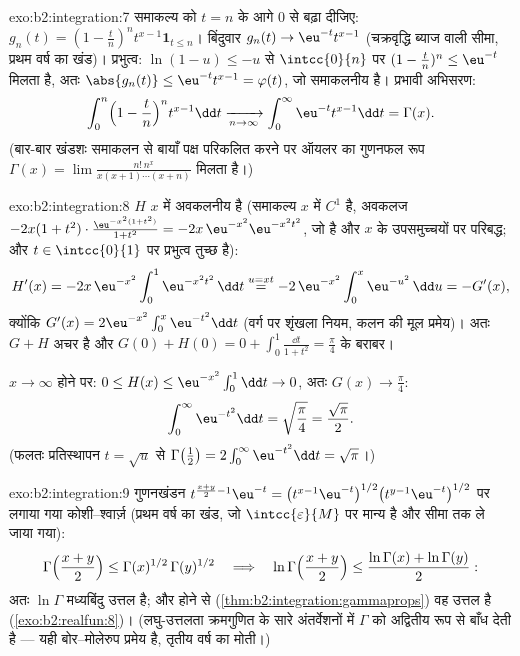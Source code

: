 \begin{solution}{exo:b2:integration:7}
समाकल्य को $t = n$ के आगे $0$ से बढ़ा दीजिए: $g_n(t) = (1 -
\frac tn)^n t^{x-1}\mathbf{1}_{t \leq n}$। बिंदुवार $g_n(t) \to
\eu^{-t}t^{x-1}$ (चक्रवृद्धि
ब्याज वाली सीमा, प्रथम वर्ष का खंड)। प्रभुत्व: $\ln(1 - u) \leq -u$ से $\intcc{0}{n}$ पर $(1 - \frac tn)^n \leq
\eu^{-t}$ मिलता
है, अतः $\abs{g_n(t)} \leq
\eu^{-t}t^{x-1} = \varphi(t)$, जो समाकलनीय है। प्रभावी अभिसरण:
\[
\int_0^n \Bigl(1 - \frac tn\Bigr)^n t^{x-1}\dd t
\xrightarrow[n\to\infty]{} \int_0^\infty \eu^{-t}t^{x-1}\dd t
= \Gamma(x) .
\]
(बार-बार खंडशः समाकलन से बायाँ पक्ष परिकलित करने पर ऑयलर का गुणनफल रूप
$\Gamma(x) = \lim \frac{n!\,n^x}{x(x+1)\cdots(x+n)}$ मिलता है।)
\end{solution}

\begin{solution}{exo:b2:integration:8}
$H$ $x$ में अवकलनीय है (समाकल्य $x$ में $C^1$ है, अवकलज $-2x(1+t^2)\cdot\frac{\eu^{-x^2(1+t^2)}}{1+t^2} =
-2x\,\eu^{-x^2}\eu^{-x^2t^2}$, जो  है
और $x$ के  उपसमुच्चयों पर परिबद्ध; और $t \in \intcc{0}{1}$ पर प्रभुत्व तुच्छ है):
\[
H'(x) = -2x\,\eu^{-x^2}\int_0^1 \eu^{-x^2t^2}\,\dd t
\overset{u = xt}{=} -2\,\eu^{-x^2}\int_0^x \eu^{-u^2}\,\dd u
= -G'(x),
\]
क्योंकि $G'(x) = 2\eu^{-x^2}\int_0^x \eu^{-t^2}\dd t$ (वर्ग पर शृंखला नियम, कलन की मूल प्रमेय)। अतः $G + H$ अचर है और
$G(0) + H(0) = 0 + \int_0^1 \frac{\dd t}{1+t^2}
= \frac\pi4$ के बराबर।

$x \to \infty$ होने पर: $0 \leq H(x) \leq \eu^{-x^2}\int_0^1 \dd t \to
0$, अतः $G(x) \to \frac\pi4$:
\[
\int_0^\infty \eu^{-t^2}\dd t = \sqrt{\frac\pi4} =
\frac{\sqrt\pi}{2} .
\]
(फलतः प्रतिस्थापन $t = \sqrt u$ से $\Gamma\bigl(\frac12\bigr) = 2\int_0^\infty
\eu^{-t^2}\dd t = \sqrt\pi$।)
\end{solution}

\begin{solution}{exo:b2:integration:9}
गुणनखंडन $t^{\frac{x+y}{2}-1}\eu^{-t} = \bigl(t^{x-1}\eu^{-t}\bigr)^{1/2}
\bigl(t^{y-1}\eu^{-t}\bigr)^{1/2}$ पर लगाया गया कोशी--श्वार्ज़ (प्रथम वर्ष का खंड, जो $\intcc{\varepsilon}{M}$ पर
मान्य है और सीमा तक ले जाया गया):
\[
\Gamma\Bigl(\frac{x+y}{2}\Bigr) \leq
\Gamma(x)^{1/2}\,\Gamma(y)^{1/2}
\quad\Longrightarrow\quad
\ln\Gamma\Bigl(\frac{x+y}{2}\Bigr) \leq \frac{\ln\Gamma(x) +
\ln\Gamma(y)}{2} :
\]
अतः $\ln\Gamma$ मध्यबिंदु उत्तल है; और  होने से (\cref{thm:b2:integration:gammaprops}) वह उत्तल है (\cref{exo:b2:realfun:8})।
(लघु-उत्तलता क्रमगुणित के सारे अंतर्वेशनों में $\Gamma$ को अद्वितीय रूप से बाँध
देती है --- यही बोर--मोलेरुप प्रमेय है, तृतीय वर्ष का मोती।)
\end{solution}

